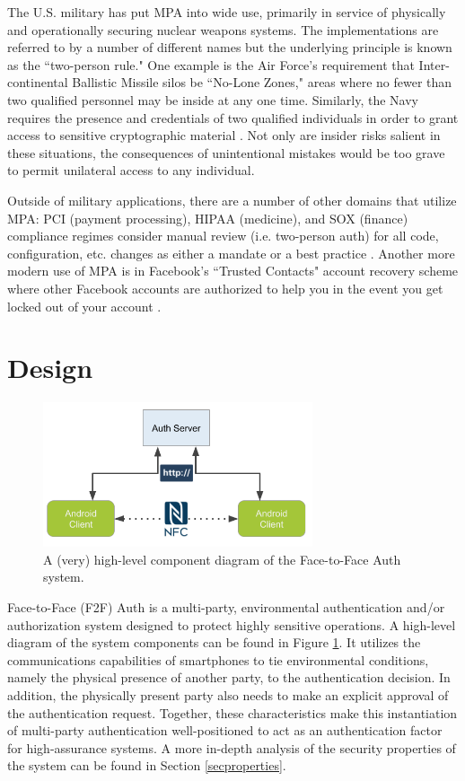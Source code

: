 \documentclass[letterpaper, 10 pt, conference]{ieeeconf}
\begin{document}
  The U.S. military has put MPA into wide use, primarily in service of physically and operationally securing nuclear weapons systems.
  The implementations are referred to by a number of different names but the underlying principle is known as the ``two-person rule."
  One example is the Air Force's requirement that Inter-continental Ballistic Missile silos be ``No-Lone Zones," areas where no fewer than two qualified personnel may be inside at any one time.
  Similarly, the Navy requires the presence and credentials of two qualified individuals in order to grant access to sensitive cryptographic material \cite{navy}.
  Not only are insider risks salient in these situations, the consequences of unintentional mistakes would be too grave to permit unilateral access to any individual.

  Outside of military applications, there are a number of other domains that utilize MPA:
  PCI (payment processing), HIPAA (medicine), and SOX (finance) compliance regimes consider manual review (i.e. two-person auth) for all code, configuration, etc. changes as either a mandate or a best practice \cite{pci} \cite{mscomp}.
  Another more modern use of MPA is in Facebook's ``Trusted Contacts" account recovery scheme where other Facebook accounts are authorized to help you in the event you get locked out of your account \cite{fb}.

\section{Design} \label{design}

  \begin{figure}
    \centering
    \includegraphics[width=300px]{component-diagram.png}
    \caption{A (very) high-level component diagram of the Face-to-Face Auth system.}
    \label{arch}
  \end{figure}

  Face-to-Face (F2F) Auth is a multi-party, environmental authentication and/or authorization system designed to protect highly sensitive operations.
  A high-level diagram of the system components can be found in Figure \ref{arch}.
  It utilizes the communications capabilities of smartphones to tie environmental conditions, namely the physical presence of another party, to the authentication decision.
  In addition, the physically present party also needs to make an explicit approval of the authentication request.
  Together, these characteristics make this instantiation of multi-party authentication well-positioned to act as an authentication factor for high-assurance systems.
  A more in-depth analysis of the security properties of the system can be found in Section \ref{secproperties}.
\end{document}
